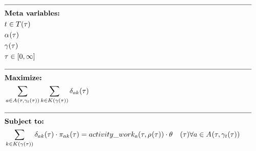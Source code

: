 \newpage
\begin{alignat}{2}
	& \text{\rule{\linewidth}{0.4pt}} \notag\\
	& \textbf{Meta variables:}                                                                                                                                                                         \notag\\
	& \ElementTechnician \in \SetTechnician                                                                                                                                                            \\
	& \VarStrategicWorkOrderAssignment{}{}                                                                                                                                                             \\
	& \VarSupervisorAssignment{}{}                                                                                                                                                                     \\
	& \tau \in [0, \infty]                                                                                                                                                                             \\
	& \text{\rule{\linewidth}{0.4pt}} \notag\\
	& \textbf{Maximize:}                                                                                                                                                                               \notag\\
	& \sum_{\ElementActivity \in \SetActivity{\VarSupervisorAssignment{}{\ElementTechnician}}{}} \sum_{\ElementWorkSegment \in \SetWorkSegment} \VarProcessingTime                                           \\
	& \text{\rule{\linewidth}{0.4pt}} \notag\\
	& \textbf{Subject to:}                                                                                                                                                                             \notag\\
    & \sum_{\ElementWorkSegment \in \SetWorkSegment} \VarProcessingTime \cdot \VarActiveSegment{\ElementActivity}{\ElementWorkSegment} = \ParActivityWork{} \cdot \VarIncludeActivity                                                                                                                                            \quad \forall \ElementActivity \in \SetActivity{\VarSupervisorAssignment{}{\ElementTechnician}}{}                                                                                                      \\

\end{alignat}
